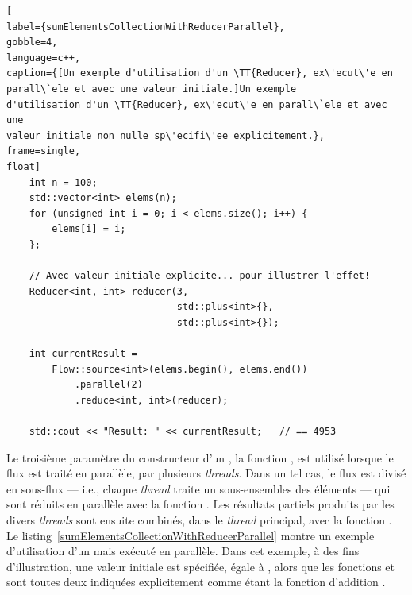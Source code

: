 \begin{lstlisting}[
label={sumElementsCollectionWithReducerParallel},
gobble=4,
language=c++,
caption={[Un exemple d'utilisation d'un \TT{Reducer}, ex\'ecut\'e en
parall\`ele et avec une valeur initiale.]Un exemple
d'utilisation d'un \TT{Reducer}, ex\'ecut\'e en parall\`ele et avec une
valeur initiale non nulle sp\'ecifi\'ee explicitement.},
frame=single,
float]
    int n = 100;
    std::vector<int> elems(n);
    for (unsigned int i = 0; i < elems.size(); i++) {
        elems[i] = i;
    };

    // Avec valeur initiale explicite... pour illustrer l'effet!
    Reducer<int, int> reducer(3, 
                              std::plus<int>{}, 
                              std::plus<int>{});

	int currentResult =
		Flow::source<int>(elems.begin(), elems.end())
            .parallel(2)
            .reduce<int, int>(reducer); 
	
	std::cout << "Result: " << currentResult;	// == 4953
\end{lstlisting}


Le troisi\`eme param\`etre du constructeur d'un , la fonction , est utilis\'e lorsque le flux est trait\'e en parall\`ele, par plusieurs \emph{threads}. Dans un tel cas, le flux est divis\'e en sous-flux --- i.e., chaque \emph{thread} traite un sous-ensembles des éléments --- qui sont r\'eduits en parall\`ele avec la fonction . Les r\'esultats partiels produits par les divers \emph{threads} sont ensuite combin\'es, dans le \emph{thread} principal, avec la fonction . Le listing~\ref{sumElementsCollectionWithReducerParallel} montre un exemple d'utilisation d'un  mais ex\'ecut\'e en parall\`ele. Dans cet exemple, \`a des fins d'illustration, une valeur initiale est sp\'ecifi\'ee, \'egale \`a , alors que les fonctions  et  sont toutes deux indiqu\'ees explicitement comme \'etant la fonction d'addition . 

